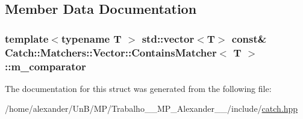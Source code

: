 \subsection{Member Data Documentation}
\hypertarget{structCatch_1_1Matchers_1_1Vector_1_1ContainsMatcher_a83d051166e4ed0d535219ad6ee99abb2}{
\subsubsection[{m\-\_\-comparator}]{\setlength{\rightskip}{0pt plus 5cm}template$<$typename T $>$ std\-::vector$<$T$>$ const\& {\bf Catch\-::\-Matchers\-::\-Vector\-::\-Contains\-Matcher}$<$ T $>$\-::m\-\_\-comparator}}\label{structCatch_1_1Matchers_1_1Vector_1_1ContainsMatcher_a83d051166e4ed0d535219ad6ee99abb2}


The documentation for this struct was generated from the following file\-:\begin{DoxyCompactItemize}
\item 
/home/alexander/\-Un\-B/\-M\-P/\-Trabalho\-\_\-\_\-\-M\-P\-\_\-\-Alexander\-\_\-\_/include/\hyperlink{catch_8hpp}{catch.\-hpp}\end{DoxyCompactItemize}
